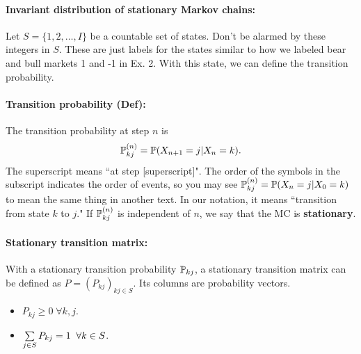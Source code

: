 \paragraph*{Invariant distribution of stationary Markov chains: } Let $S = \{ 1, 2, \ldots, I \}$ be a countable set of states. Don't be alarmed by these integers in $S$. These are just labels for the states similar to how we labeled bear and bull markets 1 and -1 in Ex. 2. With this state, we can define the transition probability. 

\paragraph*{Transition probability (Def): } The transition probability at step $n$ is 
\[ 
	\mathbb{P}_{kj}^{(n)} = \mathbb{P} (X_{n+1} = j | X_n = k ) .
\] 
The superscript means ``at step [superscript]". The order of the symbols in the subscript indicates the order of events, so you may see $\mathbb{P}_{kj}^{(n)} = \mathbb{P} (X_n = j | X_0 = k)$ to mean the same thing in another text. In our notation, it means ``transition from state $k$ to $j$."  If $\mathbb{P}_{kj}^{(n)}$ is independent of $n$, we say that the MC is \textbf{stationary}. 

\paragraph*{Stationary transition matrix: } With a stationary transition probability $\mathbb{P}_{kj}$, a stationary transition matrix can be defined as $P = (P_{kj})_{kj\in S}$. 
Its columns are probability vectors.
\begin{itemize}
	\item $P_{kj} \geq 0\; \forall k, j$. 
	\item $\sum\limits_{j\in S} P_{kj} = 1 \;\; \forall k \in S $.  
\end{itemize}

